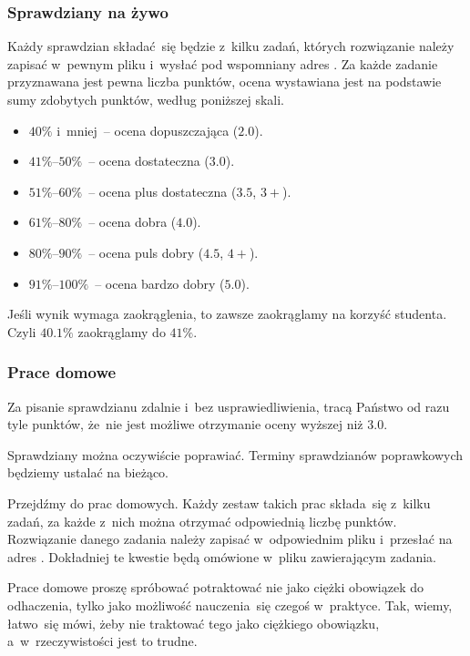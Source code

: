 \documentclass[10pt,t]{beamer}
\begin{document}
\begin{frame}
  \frametitle{Sprawdziany na żywo}


  Każdy sprawdzian składać~się będzie z~kilku zadań, których rozwiązanie
  należy zapisać w~pewnym pliku i~wysłać pod wspomniany adres \email.
  Za każde zadanie przyznawana jest pewna liczba punktów, ocena wystawiana
  jest na podstawie sumy zdobytych punktów, według poniższej skali.

  \begin{itemize}

  \item $40\%$ i~mniej~-- ocena dopuszczająca ($2.0$).

  \item $41\%\text{--}50\%$~-- ocena dostateczna ($3.0$).

  \item $51\%\text{--}60\%$~-- ocena plus dostateczna ($3.5$, $3+$).

  \item $61\%\text{--}80\%$~-- ocena dobra ($4.0$).

  \item $80\%\text{--}90\%$~-- ocena puls dobry ($4.5$, $4+$).

  \item $91\%\text{--}100\%$~-- ocena bardzo dobry ($5.0$).

  \end{itemize}

  Jeśli wynik wymaga zaokrąglenia, to zawsze zaokrąglamy na korzyść
  studenta. Czyli $40.1\%$ zaokrąglamy do $41\%$.

\end{frame}





\begin{frame}
  \frametitle{Prace domowe}


  Za pisanie sprawdzianu \alert{zdalnie} i~\alert{bez usprawiedliwienia},
  tracą Państwo od razu tyle punktów, że~nie jest możliwe otrzymanie oceny
  wyższej niż $3.0$.

  Sprawdziany można oczywiście poprawiać. Terminy sprawdzianów poprawkowych
  będziemy ustalać na bieżąco.

  Przejdźmy do prac domowych. Każdy zestaw takich prac składa~się
  z~kilku zadań, za każde z~nich można otrzymać odpowiednią liczbę punktów.
  Rozwiązanie danego zadania należy zapisać w~odpowiednim pliku i~przesłać
  na adres \email. Dokładniej te kwestie będą omówione w~pliku zawierającym
  zadania.

  Prace domowe proszę \alert{spróbować} potraktować nie jako ciężki
  obowiązek do odhaczenia, tylko jako możliwość nauczenia~się czegoś
  w~praktyce. Tak, wiemy, łatwo~się mówi, żeby nie traktować tego jako
  ciężkiego obowiązku, a~w~rzeczywistości jest to trudne.

\end{frame}
\end{document}

